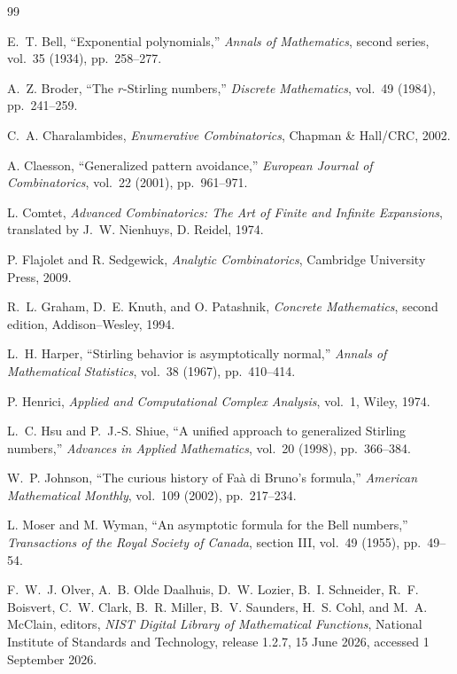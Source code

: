 \documentclass[11pt,a4paper,oneside,openany]{book}
\theoremstyle{definition}
\theoremstyle{remark}
\begin{document}
\begin{thebibliography}{99}

E.~T. Bell,
``Exponential polynomials,''
\emph{Annals of Mathematics}, second series, vol.~35 (1934), pp.~258--277.

A.~Z. Broder,
``The $r$-Stirling numbers,''
\emph{Discrete Mathematics}, vol.~49 (1984), pp.~241--259.

C.~A. Charalambides,
\emph{Enumerative Combinatorics},
Chapman \& Hall/CRC, 2002.

A. Claesson,
``Generalized pattern avoidance,''
\emph{European Journal of Combinatorics}, vol.~22 (2001), pp.~961--971.

L. Comtet,
\emph{Advanced Combinatorics: The Art of Finite and Infinite Expansions},
translated by J.~W. Nienhuys, D. Reidel, 1974.

P. Flajolet and R. Sedgewick,
\emph{Analytic Combinatorics},
Cambridge University Press, 2009.

R.~L. Graham, D.~E. Knuth, and O. Patashnik,
\emph{Concrete Mathematics}, second edition,
Addison--Wesley, 1994.

L.~H. Harper,
``Stirling behavior is asymptotically normal,''
\emph{Annals of Mathematical Statistics}, vol.~38 (1967), pp.~410--414.

P. Henrici,
\emph{Applied and Computational Complex Analysis}, vol.~1,
Wiley, 1974.

L.~C. Hsu and P.~J.-S. Shiue,
``A unified approach to generalized Stirling numbers,''
\emph{Advances in Applied Mathematics}, vol.~20 (1998), pp.~366--384.

W.~P. Johnson,
``The curious history of Faà di Bruno's formula,''
\emph{American Mathematical Monthly}, vol.~109 (2002), pp.~217--234.

L. Moser and M. Wyman,
``An asymptotic formula for the Bell numbers,''
\emph{Transactions of the Royal Society of Canada}, section III, vol.~49
(1955), pp.~49--54.

F.~W.~J. Olver, A.~B. Olde Daalhuis, D.~W. Lozier, B.~I. Schneider,
R.~F. Boisvert, C.~W. Clark, B.~R. Miller, B.~V. Saunders,
H.~S. Cohl, and M.~A. McClain, editors,
\emph{NIST Digital Library of Mathematical Functions},
National Institute of Standards and Technology, release 1.2.7, 15 June 2026,
accessed 1 September 2026.


\end{thebibliography}
\end{document}
